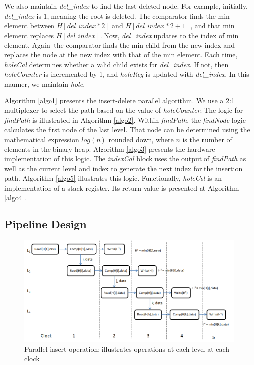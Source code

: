 \documentclass[10pt, conference, compsocconf]{IEEEtran}
\begin{document}
We also maintain {\it del\_index} to find the last deleted node.
For example, initially, {\it del\_index} is $1$, meaning the root is deleted.
The comparator finds the min element between $H[del\_index*2]$ and $H[del\_index*2 + 1]$, and that min element replaces $H[del\_index]$.
Now, {\it del\_index} updates to the index of min element.
Again, the comparator finds the min child from the new index and replaces the node at the new index with that of the min element.
Each time, {\it holeCal} determines whether a valid child exists for {\it del\_index}.
If not, then {\it holeCounter} is incremented by 1, and {\it holeReg} is updated with {\it del\_index}.
In this manner, we maintain {\it hole}.

Algorithm \ref{algo1} presents the insert-delete parallel algorithm.
We use a 2:1 multiplexer to select the path based on the value of {\it holeCounter}.
The logic for {\it findPath} is illustrated in Algorithm \ref{algo2}.
Within {\it findPath}, the {\it findNode} logic calculates the first node of the last level.
That node can be determined using the mathematical expression $log(n)$ rounded down, where $n$ is the number of elements in the binary heap.
Algorithm \ref{algo3} presents the hardware implementation of this logic.
The {\it indexCal} block uses the output of {\it findPath} as well as the current level and index to generate the next index for the insertion path. Algorithm \ref{algo5} illustrates this logic.
Functionally, {\it holeCal} is an implementation of a stack register. Its return value is presented at Algorithm \ref{algo4}.



\subsection{Pipeline Design}
\begin{figure}[!ht]
  \centering
  \includegraphics[width=12cm]{Figures/clock1.png}
      \caption{Parallel insert operation: illustrates operations at each level at each clock }
    \label{clock1}
\end{figure}
\end{document}
